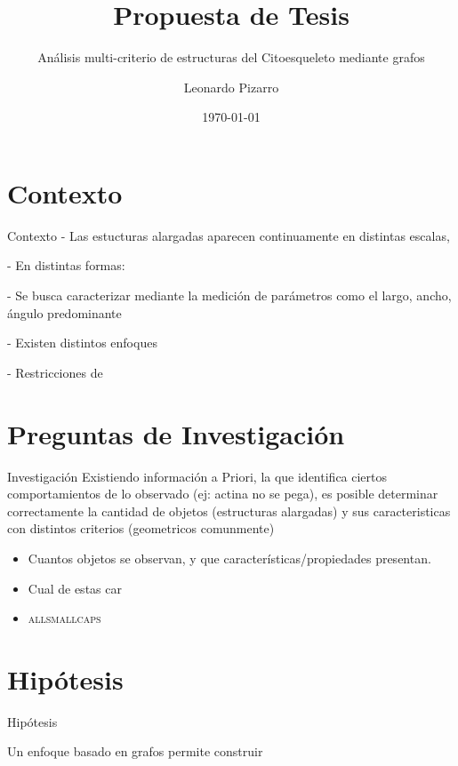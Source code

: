 \documentclass[10pt]{beamer}
\title{Propuesta de Tesis}
\subtitle{Análisis multi-criterio de estructuras del Citoesqueleto mediante grafos}
\date{\today}
\author{Leonardo Pizarro}
\institute{Trabajo de Tesis I - Primavera 2018}
\begin{document}
\maketitle


\section{Contexto}

\begin{frame}[fragile]{Contexto}
 - Las estucturas alargadas aparecen continuamente en distintas escalas, 

 - En distintas formas: 

 - Se busca caracterizar mediante la medici\'on de par\'ametros como el largo, ancho, \'angulo predominante

 - Existen distintos enfoques

 - Restricciones de 
\end{frame}

\section{Preguntas de Investigaci\'on}

\begin{frame}{Investigaci\'on}
	Existiendo información a Priori, la que identifica ciertos comportamientos de lo observado (ej: actina no se pega), es posible
 determinar correctamente la cantidad de objetos (estructuras alargadas) y sus caracteristicas con distintos criterios (geometricos comunmente)
	\begin{itemize}
		\item Cuantos objetos se observan, y que caracter\'isticas/propiedades presentan.
		\item Cual de estas car
		\item \textsc{allsmallcaps}
	\end{itemize}
\end{frame}

\section{Hip\'otesis}

\begin{frame}[fragile]{Hip\'otesis}

Un enfoque basado en grafos permite construir

\end{frame}
\end{document}
